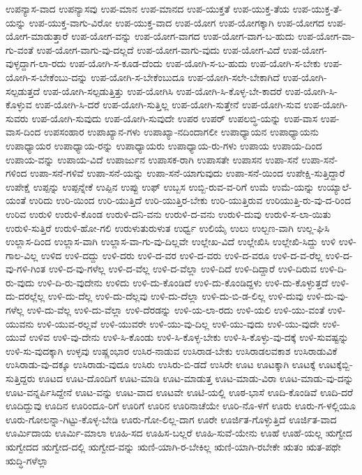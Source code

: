 ಉಪನ್ಯಾಸ-ವಾದ
ಉಪನ್ಯಾಸವು
ಉಪ-ಮಾನ
ಉಪ-ಮಾನದ
ಉಪ-ಯುಕ್ತತೆ
ಉಪ-ಯುಕ್ತ-ತೆಯ
ಉಪ-ಯುಕ್ತ-ತೆ-ಯನ್ನು
ಉಪ-ಯುಕ್ತ-ವಾಗು-ವಿರೋ
ಉಪ-ಯುಕ್ತ-ವಾದ
ಉಪ-ಯೋಗ
ಉಪ-ಯೋಗಕ್ಕಾಗಿ
ಉಪ-ಯೋಗದ
ಉಪ-ಯೋಗ-ಮಾಡುತ್ತಾರೆ
ಉಪ-ಯೋಗ-ವನ್ನು
ಉಪ-ಯೋಗ-ವಾಗದ
ಉಪ-ಯೋಗ-ವಾಗ-ಬ-ಹುದು
ಉಪ-ಯೋಗ-ವಾ-ಗು-ವಂತೆ
ಉಪ-ಯೋಗ-ವಾಗು-ವು-ದಲ್ಲದೆ
ಉಪ-ಯೋಗ-ವಾಗು-ವುದು
ಉಪ-ಯೋಗ-ವಿದೆ
ಉಪ-ಯೋಗ-ವುಳ್ಳದ್ದಾಗ-ಲಾ-ರದು
ಉಪ-ಯೋಗಿ-ಸ-ಕೂಡ-ದೆಂದು
ಉಪ-ಯೋಗಿ-ಸ-ಬ-ಹುದು
ಉಪ-ಯೋಗಿ-ಸ-ಬೇಕು
ಉಪ-ಯೋಗಿ-ಸ-ಬೇಕೆಂಬು-ದನ್ನು
ಉಪ-ಯೋಗಿ-ಸ-ಬೇಕೆಂಬುದೂ
ಉಪ-ಯೋಗಿ-ಸಲೇ-ಬೇಕಾಗಿದೆ
ಉಪ-ಯೋಗಿ-ಸಲ್ಪಡುತ್ತದೆ
ಉಪ-ಯೋಗಿ-ಸಲ್ಪಡುತ್ತಿತ್ತು
ಉಪ-ಯೋಗಿಸಿ
ಉಪ-ಯೋಗಿ-ಸಿ-ಕೊಳ್ಳ-ಬೇ-ಕಾದರೆ
ಉಪ-ಯೋಗಿ-ಸಿ-ಕೊಳ್ಳುವ
ಉಪ-ಯೋಗಿ-ಸಿ-ದರೆ
ಉಪ-ಯೋಗಿ-ಸುತ್ತಿಲ್ಲ
ಉಪ-ಯೋಗಿ-ಸುತ್ತೇನೆ
ಉಪ-ಯೋಗಿ-ಸುವ
ಉಪ-ಯೋಗಿ-ಸುವರು
ಉಪ-ಯೋಗಿ-ಸುವುದು
ಉಪ-ಯೋಗಿ-ಸುವುದೇ
ಉಪರ
ಉಪರ್
ಉಪಲಬ್ಧಿ-ಯನ್ನು
ಉಪ-ವಾಸ
ಉಪ-ವಾಸ-ದಿಂದ
ಉಪಸಂಹಾರ
ಉಪಾಖ್ಯಾನ-ಗಳು
ಉಪಾಖ್ಯಾ-ನದಿಂದಾಗಲೀ
ಉಪಾಧ್ಯಾಯನ
ಉಪಾಧ್ಯಾಯನು
ಉಪಾಧ್ಯಾಯರ
ಉಪಾಧ್ಯಾಯ-ರನ್ನು
ಉಪಾಧ್ಯಾಯರು
ಉಪಾಧ್ಯಾಯ-ರು-ಗಳು
ಉಪಾಯ
ಉಪಾಯ-ದಿಂದ
ಉಪಾಯ-ವನ್ನು
ಉಪಾಯ-ವಿದೆ
ಉಪಾರ್ಜುನ
ಉಪಾಸಕ-ರಾಗಿ
ಉಪಾಸತೇ
ಉಪಾಸನ
ಉಪಾ-ಸನೆ
ಉಪಾ-ಸನೆ-ಗಳಿಂದ
ಉಪಾ-ಸನೆ-ಗಳಿವೆ
ಉಪಾ-ಸನೆ-ಯನ್ನು
ಉಪಾ-ಸನೆ-ಯಾಗುವುದು
ಉಪಾ-ಸನೆ-ಯಿಂದ
ಉಪೇಕ್ಷಿ-ಸುತ್ತಿದ್ದಾರೆ
ಉಪೇಕ್ಷೆ
ಉಪ್ಪನ್ನು
ಉಪ್ಪನ್ನೇಕೆ
ಉಪ್ಪಿನ
ಉಪ್ಪು
ಉಫ್
ಉಬ್ಬಸ
ಉಬ್ಬಿ-ರುವ-ವ-ರಿಗೆ
ಉಮೆ
ಉಮೆ-ಯನ್ನು
ಉಯ್ಯಾಲೆ-ಯಂತೆ
ಉರಿದು
ಉರಿ-ಯಿಂದ
ಉರಿ-ಯುತ್ತಿದೆ
ಉರಿ-ಯುತ್ತಿರ-ಬೇಕು
ಉರಿ-ಯುತ್ತಿರುವ
ಉರಿಯುತ್ತಿ-ರು-ವು-ದ-ರಿಂದ
ಉರಿವ
ಉರುಳಿ
ಉರುಳಿ-ಕೊಂಡ
ಉರುಳಿ-ದನಿ-ವನು
ಉರುಳಿ-ದ-ವನು
ಉರುಳಿ-ದುವು
ಉರುಳಿ-ಸ-ಲಾ-ಯಿತು
ಉರುಳಿ-ಸುತ್ತಿರೆ
ಉರುಳಿ-ಹೋ-ಗಲಿ
ಉರುಳುತುರುಳುತ
ಉರ್ಧ್ವ
ಉಲಿಯೈ
ಉಲು
ಉಲ್ಬಣ-ವಾಗಿ
ಉಲ್ಲ-ಘಿಸಿ
ಉಲ್ಲಾಸ-ದಿಂದ
ಉಲ್ಲಾಸ-ವಾಗಿ
ಉಲ್ಲಾಸ-ವಾ-ಗು-ವು-ದಿಲ್ಲವೇ
ಉಲ್ಲೇಖ-ವಿದೆ
ಉಲ್ಲೇಖಿಸಿ
ಉಲ್ಲೇಖಿ-ಸಿದ್ದು
ಉಳಿ
ಉಳಿ-ಗಾಲ-ವಿಲ್ಲ
ಉಳಿದ
ಉಳಿ-ದದ್ದು
ಉಳಿ-ದರು
ಉಳಿ-ದ-ವರ
ಉಳಿ-ದ-ವರು
ಉಳಿ-ದ-ವರೂ
ಉಳಿ-ದ-ವ-ರೆಲ್ಲ
ಉಳಿ-ದ-ವು-ಗಳಿ-ಗಿಂತ
ಉಳಿ-ದ-ವು-ಗಳೆಲ್ಲ
ಉಳಿ-ದ-ವೆಲ್ಲ
ಉಳಿ-ದ-ವೆಲ್ಲಾ
ಉಳಿ-ದಿದೆ
ಉಳಿ-ದಿದ್ದಾರೆ
ಉಳಿ-ದಿರುವ
ಉಳಿ-ದಿ-ರು-ವುದು
ಉಳಿ-ದಿ-ರು-ವುದೇನು
ಉಳಿದು
ಉಳಿ-ದು-ಕೊಂಡಿದೆ
ಉಳಿ-ದು-ಕೊಂಡಿದ್ದಳು
ಉಳಿ-ದು-ಕೊಳ್ಳುತ್ತದೆ
ಉಳಿ-ದು-ದರಲ್ಲೆಲ್ಲ
ಉಳಿ-ದು-ದೆಲ್ಲ
ಉಳಿ-ದು-ದೆಲ್ಲವು
ಉಳಿ-ದು-ದೆಲ್ಲಾ
ಉಳಿ-ದು-ಬಿ-ಡ-ಲಿಲ್ಲ
ಉಳಿ-ದುವು
ಉಳಿ-ದು-ವು-ಗಳೆಲ್ಲ
ಉಳಿ-ದು-ವೆಲ್ಲ
ಉಳಿ-ದು-ವೆಲ್ಲಾ
ಉಳಿ-ದೆರಡನ್ನು
ಉಳಿ-ಯ-ಲಾ-ರದು
ಉಳಿ-ಯಲಿ
ಉಳಿ-ಯು-ವಂತೆ
ಉಳಿ-ಯುವನು
ಉಳಿ-ಯುವ-ರಲ್ಲವೆ
ಉಳಿ-ಯುವರೇ
ಉಳಿ-ಯು-ವು-ದಿಲ್ಲ
ಉಳಿ-ಯು-ವುದು
ಉಳಿ-ಯು-ವುದೇ
ಉಳಿ-ಯುವೆ
ಉಳಿವ
ಉಳಿ-ವು-ದೇನು
ಉಳಿ-ಸಿ-ಕೊಂಡು
ಉಳಿ-ಸಿ-ಕೊಳ್ಳ-ಬೇಕು
ಉಳಿ-ಸಿ-ಕೊಳ್ಳು-ವು-ದಕ್ಕೆ
ಉಳಿ-ಸುವಷ್ಟನ್ನು
ಉಳಿ-ಸು-ವುದಕ್ಕಾಗಿ
ಉಳ್ಳವು
ಉಷ್ಣಂಭಾರ
ಉಸಿರ-ನಾಡುವ
ಉಸಿರಾಡ-ಬೇಕು
ಉಸಿರಾಡಲವಕಾಶ
ಉಸಿರಾಡುವಿಕೆ
ಉಸಿರಾಡು-ವು-ದಕ್ಕೂ
ಉಸಿರಾಡು-ವುದೂ
ಉಸಿರು
ಉಸಿರು-ಬಿ-ಡದೆ
ಉಸಿರೇ
ಊಟ
ಊಟಕ್ಕಾಗಿ
ಊಟಕ್ಕೆ
ಊಟಕ್ಕೆಬ್ಬಿ-ಸುತ್ತಿದ್ದರು
ಊಟದ
ಊಟ-ದೊಂದಿಗೆ
ಊಟ-ಮಾಡಿ
ಊಟ-ಮಾಡುತ್ತ
ಊಟ-ಮಾಡು-ವಿರಾ
ಊಟ-ಮಾಡು-ವು-ದನ್ನು
ಊಟ-ವನ್ನರ್ಪಿಸಿದ್ದೇನೆ
ಊಟ-ವನ್ನು
ಊಟ-ವಾದ
ಊಟವೇ
ಊಟಿ-ಯಲ್ಲಿ
ಊಠ-ಭಾಸೆ
ಊದಿ-ಕೊಂಡಿವೆ
ಊದಿ-ದರೆ
ಊದಿದ್ದುವು
ಊದಿನ
ಊರಿಂದೂ-ರಿಗೆ
ಊರಿಗೆ
ಊರಿನ
ಊರಿನಾಚೆಯೇ
ಊರಿ-ನೊ-ಳಗೆ
ಊರು
ಊರು-ಗ-ಳಲ್ಲಿಯೂ
ಊರು-ಗೋಲನ್ನಾ-ಗಿಟ್ಟು-ಕೊಳ್ಳ-ಬೇಡಿ
ಊರು-ಗೋ-ಲಿಲ್ಲ-ದಾಗ
ಊರೇ
ಊರ್ಜಿತ-ಗೊಳ್ಳುತ್ತಿದೆ
ಊರ್ಜಿತ-ವಾದ
ಊರ್ಮಿದಾಯ
ಊರ್ಮಿ-ಮಾಲಾ
ಊಹಿ-ಸದ
ಊಹಿಸ-ಬಲ್ಲರೆ
ಊಹಿ-ಸುವೆ-ಯೇನು
ಊಹೆ
ಊಹೆ-ಯಲ್ಲ
ಋಗ್ವೇದ
ಋಗ್ವೇದದ
ಋಗ್ವೇದ-ದಲ್ಲಿ
ಋಗ್ವೇದ-ವನ್ನು
ಋಣಿ-ಯಾಗಿ-ರ-ಬೇಕಿಲ್ಲ
ಋಣಿ-ಯಾಗಿ-ರಬೇಕೇ
ಋತಂ
ಋತ-ಪಥೇ
ಋದ್ಧಿ-ಗಳೆಲ್ಲಾ
